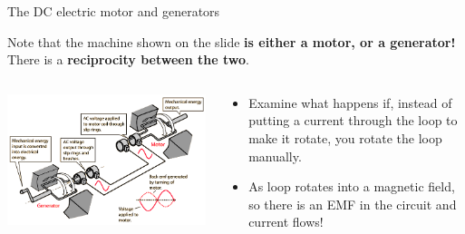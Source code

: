 %
%
%

\begin{frame}{The DC electric motor and generators}

Note that the machine shown on the slide {\bf is either a motor, or a generator!}
There is a {\bf reciprocity between the two}.

\begin{columns}
  \begin{column}{0.70\textwidth}
    \begin{center}
     \includegraphics[width=0.99\textwidth]{./images/schematics/electric_motor_as_generator.png}\\
    \end{center}
  \end{column}
  \begin{column}{0.30\textwidth}
  {\scriptsize
    \begin{itemize}
     \item Examine what happens if, instead of putting a current through the loop to make it rotate, you rotate the loop manually.
     \item As loop rotates into a magnetic field, so there is an EMF in the circuit and current flows!
    \end{itemize}
  }
  \end{column}
\end{columns}

\end{frame}

%
%
%

